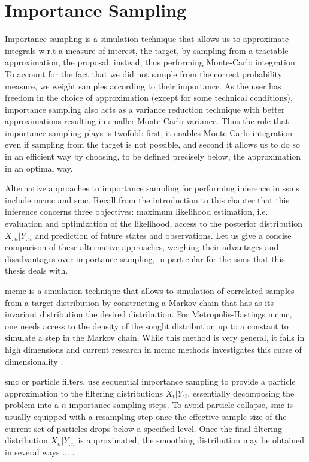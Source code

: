 \section{Importance Sampling}
\label{sec:importance_sampling}
Importance sampling is a simulation technique that allows us to approximate integrals w.r.t a measure of interest, the target, by sampling from a tractable approximation, the proposal, instead, thus performing Monte-Carlo integration. To account for the fact that we did not sample from the correct probability measure, we weight samples according to their importance. As the user has freedom in the choice of approximation (except for some technical conditions), importance sampling also acts as a variance reduction technique with better approximations resulting in smaller Monte-Carlo variance. Thus the role that importance sampling plays is twofold: first, it enables Monte-Carlo integration even if sampling from the target is not possible, and second it allows us to do so in an efficient way by choosing, to be defined precisely below, the approximation in an optimal way.

Alternative approaches to importance sampling for performing inference in \glspl{ssm} include \gls{mcmc} and \gls{smc}. 
Recall from the introduction to this chapter that this inference concerns three objectives: maximum likelihood estimation, i.e. evaluation and optimization of the likelihood, access to the posterior distribution $X_{:n} | Y_{:n}$ and prediction of future states and observations. Let us give a concise comparison of these alternative approaches, weighing their advantages and disadvantages over importance sampling, in particular for the \glspl{ssm} that this thesis deals with. 

\gls{mcmc} \citep{Brooks2011Handbook} is a simulation technique that allows to simulation of correlated samples from a target distribution by constructing a Markov chain that has as its invariant distribution the desired distribution. For Metropolis-Hastings \gls{mcmc}, one needs access to the density of the sought distribution up to a constant to simulate a step in the Markov chain. While this method is very general, it fails in high dimensions and current research in \gls{mcmc} methods investigates this  curse of dimensionality . 


\gls{smc} \citep{Chopin2020Introduction} or particle filters, use sequential importance sampling to provide a particle approximation to the filtering distributions $X_{t} | Y_{:t}$, essentially decomposing the problem into a $n$ importance sampling steps. 
To avoid particle collapse, \gls{smc} is usually equipped with a resampling step once the effective sample size of the current set of particles drops below a specified level. Once the final filtering distribution $X_{n}|Y_{:n}$ is approximated, the smoothing distribution may be obtained in several ways ... .

